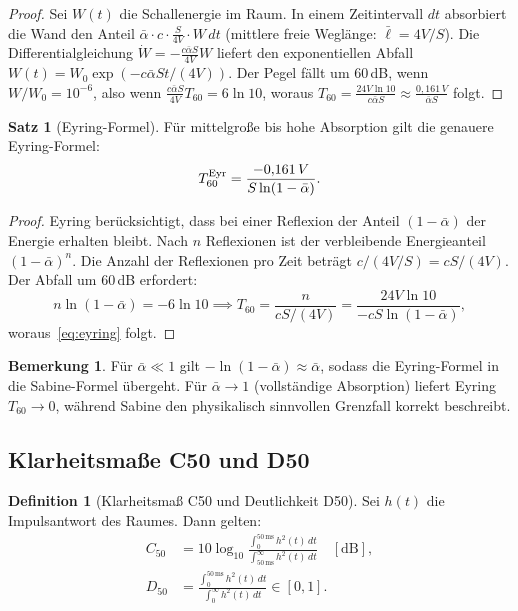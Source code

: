 ﻿\documentclass[12pt, a4paper]{article}
\theoremstyle{definition}
\newtheorem{definition}{Definition}[section]
\newtheorem{satz}{Satz}[section]
\newtheorem{bemerkung}{Bemerkung}[section]
\theoremstyle{remark}
\begin{document}
\begin{proof}
Sei $W(t)$ die Schallenergie im Raum. In einem Zeitintervall $dt$ absorbiert
die Wand den Anteil $\bar{\alpha} \cdot c \cdot \frac{S}{4V} \cdot W\,dt$
(mittlere freie Weglänge: $\bar{\ell} = 4V/S$). Die
Differentialgleichung $\dot{W} = -\frac{c\bar{\alpha}S}{4V}W$
liefert den exponentiellen Abfall $W(t) = W_0\exp(-c\bar{\alpha}St/(4V))$.
Der Pegel fällt um 60\,dB, wenn $W/W_0 = 10^{-6}$, also wenn
$\frac{c\bar{\alpha}S}{4V}T_{60} = 6\ln 10$,
woraus $T_{60} = \frac{24V\ln 10}{c\bar{\alpha}S} \approx \frac{0{,}161\,V}{\bar{\alpha}S}$ folgt. 
\end{proof}

\begin{satz}[Eyring-Formel]
\label{satz:eyring}
Für mittelgroße bis hohe Absorption gilt die genauere Eyring-Formel:
\begin{equation}
  T_{60}^{\rm Eyr} = \frac{-0{,}161\,V}{S\ln(1-\bar{\alpha})}.
  \label{eq:eyring}
\end{equation}
\end{satz}

\begin{proof}
Eyring berücksichtigt, dass bei einer Reflexion der Anteil $(1-\bar{\alpha})$
der Energie erhalten bleibt. Nach $n$ Reflexionen ist der verbleibende
Energieanteil $(1-\bar{\alpha})^n$. Die Anzahl der Reflexionen pro Zeit
beträgt $c/(4V/S) = cS/(4V)$. Der Abfall um 60\,dB erfordert:
\[
  n\ln(1-\bar{\alpha}) = -6\ln 10 \implies
  T_{60} = \frac{n}{cS/(4V)} = \frac{24V\ln 10}{-cS\ln(1-\bar{\alpha})},
\]
woraus~\eqref{eq:eyring} folgt. 
\end{proof}

\begin{bemerkung}
Für $\bar{\alpha} \ll 1$ gilt $-\ln(1-\bar{\alpha}) \approx \bar{\alpha}$,
sodass die Eyring-Formel in die Sabine-Formel übergeht. Für $\bar{\alpha} \to 1$
(vollständige Absorption) liefert Eyring $T_{60} \to 0$, während Sabine
den physikalisch sinnvollen Grenzfall korrekt beschreibt.
\end{bemerkung}

\subsection{Klarheitsmaße C50 und D50}

\begin{definition}[Klarheitsmaß C50 und Deutlichkeit D50]
Sei $h(t)$ die Impulsantwort des Raumes. Dann gelten:
\begin{align}
  C_{50} &= 10\log_{10}\frac{\int_0^{50\,\text{ms}} h^2(t)\,dt}
                             {\int_{50\,\text{ms}}^\infty h^2(t)\,dt}
  \quad [\text{dB}],
  \label{eq:c50}\\[6pt]
  D_{50} &= \frac{\int_0^{50\,\text{ms}} h^2(t)\,dt}
                  {\int_0^\infty h^2(t)\,dt} \in [0,1].
  \label{eq:d50}
\end{align}
\end{definition}
\end{document}
